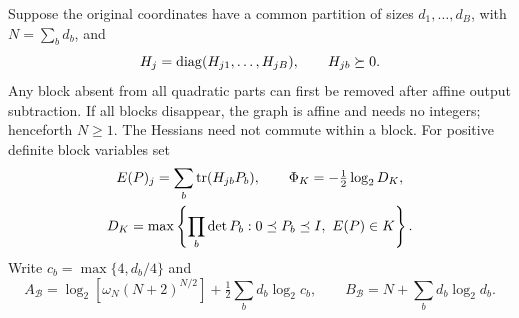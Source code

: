 Suppose the original coordinates have a common partition of sizes
$d_1,\ldots,d_B$, with $N=\sum_bd_b$, and
\[
 H_j=\operatorname{diag}(H_{j1},\ldots,H_{jB}),\qquad H_{jb}\succeq0.
\]
Any block absent from all quadratic parts can first be removed after
affine output subtraction. If all blocks disappear, the graph is affine
and needs no integers; henceforth $N\ge1$. The Hessians need not commute
within a block. For positive definite block variables set
\[
 \begin{gathered}
 E(P)_j=\sum_b\operatorname{tr}(H_{jb}P_b),\qquad
 \Phi_K=-\tfrac12\log_2D_K,\\
 D_K=\max\left\{\prod_b\det P_b:0\preceq P_b\preceq I,\ E(P)\in K\right\}.
 \end{gathered}
\]
Write $c_b=\max\{4,d_b/4\}$ and
\begin{equation}\label{eq:block-constants}
 A_{\mathcal B}=\log_2[\omega_N(N+2)^{N/2}]
                  +\tfrac12\sum_bd_b\log_2c_b,
 \qquad B_{\mathcal B}=N+\sum_bd_b\log_2d_b.
\end{equation}

